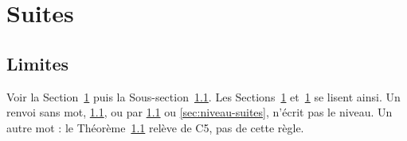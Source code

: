 \section{Suites}\label{sec:niveau-suites}
\subsection{Limites}\label{ssec:niveau-limites}

Voir la Section~\ref{sec:niveau-suites} puis la Sous-section~\ref{ssec:niveau-limites}.
Les Sections~\ref{sec:niveau-suites} et~\ref{sec:niveau-suites} se lisent ainsi.
Un renvoi sans mot, \ref{ssec:niveau-limites}, ou par \cref{ssec:niveau-limites}
ou \autoref{sec:niveau-suites}, n'écrit pas le niveau.
Un autre mot : le Théorème~\ref{ssec:niveau-limites} relève de C5, pas de cette règle.
